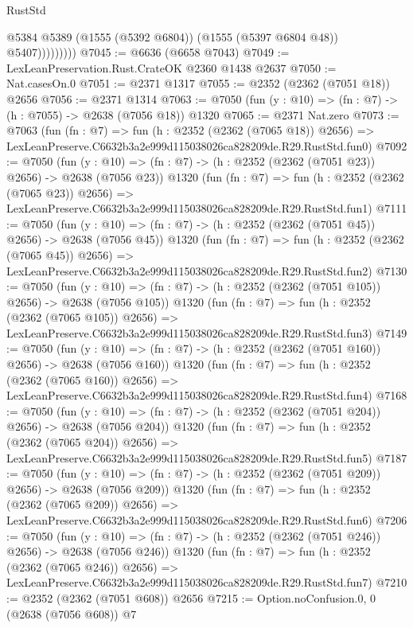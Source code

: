 \begin{lexlean}{RustStd}
\begin{coremodule}
                      @5384
                      @5389
                      (@1555 (@5392 @6804))
                      (@1555 (@5397 @6804 @48))
                      @5407)))))))))
@7045 := @6636 (@6658 @7043)
@7049 := LexLeanPreservation.Rust.CrateOK @2360 @1438 @2637
@7050 := Nat.casesOn.{0}
@7051 := @2371 @1317
@7055 := @2352 (@2362 (@7051 @18)) @2656
@7056 := @2371 @1314
@7063 := @7050 (fun (y : @10) => (fn : @7) -> (h : @7055) -> @2638 (@7056 @18)) @1320
@7065 := @2371 Nat.zero
@7073 := @7063
    (fun (fn : @7) =>
    fun (h : @2352 (@2362 (@7065 @18)) @2656) =>
    LexLeanPreserve.C6632b3a2e999d115038026ca828209de.R29.RustStd.fun0)
@7092 := @7050
    (fun (y : @10) => (fn : @7) -> (h : @2352 (@2362 (@7051 @23)) @2656) -> @2638 (@7056 @23))
    @1320
    (fun (fn : @7) =>
    fun (h : @2352 (@2362 (@7065 @23)) @2656) =>
    LexLeanPreserve.C6632b3a2e999d115038026ca828209de.R29.RustStd.fun1)
@7111 := @7050
    (fun (y : @10) => (fn : @7) -> (h : @2352 (@2362 (@7051 @45)) @2656) -> @2638 (@7056 @45))
    @1320
    (fun (fn : @7) =>
    fun (h : @2352 (@2362 (@7065 @45)) @2656) =>
    LexLeanPreserve.C6632b3a2e999d115038026ca828209de.R29.RustStd.fun2)
@7130 := @7050
    (fun (y : @10) => (fn : @7) -> (h : @2352 (@2362 (@7051 @105)) @2656) -> @2638 (@7056 @105))
    @1320
    (fun (fn : @7) =>
    fun (h : @2352 (@2362 (@7065 @105)) @2656) =>
    LexLeanPreserve.C6632b3a2e999d115038026ca828209de.R29.RustStd.fun3)
@7149 := @7050
    (fun (y : @10) => (fn : @7) -> (h : @2352 (@2362 (@7051 @160)) @2656) -> @2638 (@7056 @160))
    @1320
    (fun (fn : @7) =>
    fun (h : @2352 (@2362 (@7065 @160)) @2656) =>
    LexLeanPreserve.C6632b3a2e999d115038026ca828209de.R29.RustStd.fun4)
@7168 := @7050
    (fun (y : @10) => (fn : @7) -> (h : @2352 (@2362 (@7051 @204)) @2656) -> @2638 (@7056 @204))
    @1320
    (fun (fn : @7) =>
    fun (h : @2352 (@2362 (@7065 @204)) @2656) =>
    LexLeanPreserve.C6632b3a2e999d115038026ca828209de.R29.RustStd.fun5)
@7187 := @7050
    (fun (y : @10) => (fn : @7) -> (h : @2352 (@2362 (@7051 @209)) @2656) -> @2638 (@7056 @209))
    @1320
    (fun (fn : @7) =>
    fun (h : @2352 (@2362 (@7065 @209)) @2656) =>
    LexLeanPreserve.C6632b3a2e999d115038026ca828209de.R29.RustStd.fun6)
@7206 := @7050
    (fun (y : @10) => (fn : @7) -> (h : @2352 (@2362 (@7051 @246)) @2656) -> @2638 (@7056 @246))
    @1320
    (fun (fn : @7) =>
    fun (h : @2352 (@2362 (@7065 @246)) @2656) =>
    LexLeanPreserve.C6632b3a2e999d115038026ca828209de.R29.RustStd.fun7)
@7210 := @2352 (@2362 (@7051 @608)) @2656
@7215 := Option.noConfusion.{0, 0} (@2638 (@7056 @608)) @7

\end{coremodule}
\end{lexlean}
